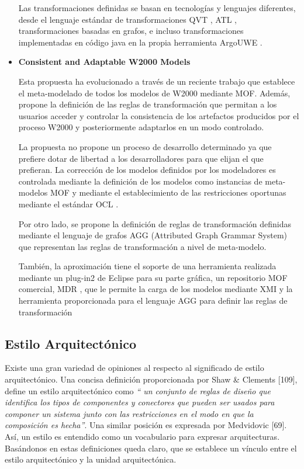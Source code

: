 \begin{itemize}
Las transformaciones definidas se basan en tecnologías y lenguajes diferentes,
desde el lenguaje estándar de transformaciones QVT \cite{QVT}, ATL
\cite{}, transformaciones basadas en grafos, e incluso transformaciones
implementadas en código java en la propia herramienta ArgoUWE \cite{3}.


\item \textbf{Consistent and Adaptable W2000 Models}


Esta propuesta ha evolucionado a través de un reciente trabajo \cite{9} que establece el meta-modelado de todos los modelos de W2000 mediante MOF. Además, propone la definición de las reglas de transformación que permitan a los usuarios acceder y controlar la consistencia de los artefactos producidos por el proceso W2000 y posteriormente adaptarlos en un modo controlado.


La propuesta no propone un proceso de desarrollo determinado ya que prefiere
dotar de libertad a los desarrolladores para que elijan el que prefieran.
La corrección de los modelos definidos por los modeladores es controlada
mediante la definición de los modelos como instancias de meta-modelos MOF y
mediante el establecimiento de las restricciones oportunas mediante el estándar
OCL \cite{93}.  

Por otro lado, se propone la definición de reglas de transformación definidas
mediante el lenguaje de grafos AGG (Attributed Graph Grammar System) \cite{28} que
representan las reglas de transformación a nivel de meta-modelo.

También, la aproximación tiene el soporte de una herramienta realizada mediante
un plug-in2 de Eclipse \cite{27} para su parte gráfica, un repositorio MOF comercial,
MDR \cite{79}, que le permite la carga de los modelos mediante XMI y la herramienta
proporcionada para el lenguaje AGG \cite{28} para definir las reglas de
transformación

\end{itemize}



\subsection {Estilo Arquitectónico}

Existe una gran variedad de opiniones al respecto al significado de estilo
arquitectónico. Una concisa definición proporcionada por Shaw \& Clements [109],
define un estilo arquitectónico como \textit{`` un conjunto de reglas de diseño
que identifica los tipos de componentes y conectores 
que pueden ser usados para componer un sistema junto con las restricciones en el
modo en que la composición es hecha''}. Una
similar posición es expresada por Medvidovic [69]. Así, un estilo es
entendido como un vocabulario para expresar arquitecturas. Basándonos en estas
definiciones queda claro, que se establece un vínculo entre el estilo
arquitectónico y la
unidad arquitectónica.

